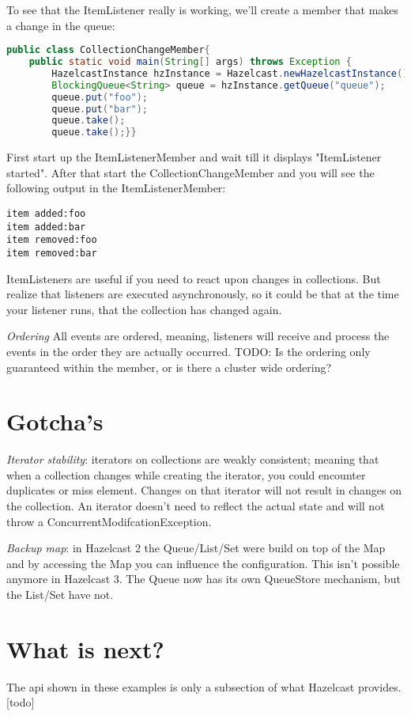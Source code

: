 To see that the ItemListener really is working, we'll create a member that makes a change in the queue:
\begin{lstlisting}[language=java]
public class CollectionChangeMember{
    public static void main(String[] args) throws Exception {
        HazelcastInstance hzInstance = Hazelcast.newHazelcastInstance();
        BlockingQueue<String> queue = hzInstance.getQueue("queue");
        queue.put("foo");
        queue.put("bar");
        queue.take();
        queue.take();}}
\end{lstlisting}
First start up the ItemListenerMember and wait till it displays "ItemListener started". After that start the CollectionChangeMember and you will see the following output in the ItemListenerMember:
\begin{lstlisting}
item added:foo
item added:bar
item removed:foo
item removed:bar
\end{lstlisting}
ItemListeners are useful if you need to react upon changes in collections. But realize that listeners are executed asynchronously, so it could be that at the time your listener runs, that the collection has changed again. 

\emph{Ordering} All events are ordered, meaning, listeners will receive and process the events in the order they are actually occurred. TODO: Is the ordering only guaranteed within the member, or is there a cluster wide ordering?

\section{Gotcha's}

\emph{Iterator stability}: iterators on collections are weakly consistent; meaning that when a collection changes while creating the iterator, you could encounter duplicates or miss element. Changes on that iterator will not result in changes on the collection. An iterator doesn't need to reflect the actual state and will not throw a ConcurrentModifcationException. 

\emph{Backup map}: in Hazelcast 2 the Queue/List/Set were build on top of the Map and by accessing the Map you can influence the configuration. This isn't possible anymore in Hazelcast 3. The Queue now has its own QueueStore mechanism, but the List/Set have not.

\section{What is next?}
The api shown in these examples is only a subsection of what Hazelcast provides.[todo]